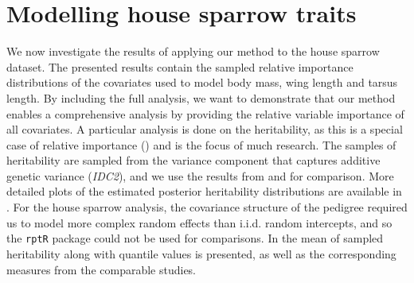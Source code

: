\section{Modelling house sparrow traits}
\label{sec:heritability_results}
We now investigate the results of applying our method to the house sparrow dataset. The presented results contain the sampled relative importance distributions of the covariates used to model body mass, wing length and tarsus length. By including the full analysis, we want to demonstrate that our method enables a comprehensive analysis by providing the relative variable importance of all covariates. A particular analysis is done on the heritability, as this is a special case of relative importance () and is the focus of much research. The samples of heritability are sampled from the variance component that captures additive genetic variance (\textit{IDC2}), and we use the results from \citet{Silva2017} and \citet{Muff2019Genetic} for comparison. More detailed plots of the estimated posterior heritability distributions are available in . For the house sparrow analysis, the covariance structure of the pedigree required us to model more complex random effects than i.i.d. random intercepts, and so the \texttt{rptR} package could not be used for comparisons. In  the mean of sampled heritability along with quantile values is presented, as well as the corresponding measures from the comparable studies.
